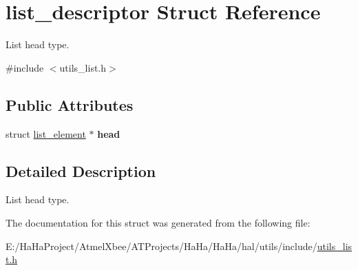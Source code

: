 \hypertarget{structlist__descriptor}{}\section{list\+\_\+descriptor Struct Reference}
\label{structlist__descriptor}


List head type.  




{\ttfamily \#include $<$utils\+\_\+list.\+h$>$}

\subsection*{Public Attributes}
\begin{DoxyCompactItemize}
\item 
\mbox{\label{structlist__descriptor_acc7a3bb5c92dc985a2a7c27c958f1ed8}} 
struct \hyperlink{structlist__element}{list\+\_\+element} $\ast$ {\bfseries head}
\end{DoxyCompactItemize}


\subsection{Detailed Description}
List head type. 

The documentation for this struct was generated from the following file\+:\begin{DoxyCompactItemize}
\item 
E\+:/\+Ha\+Ha\+Project/\+Atmel\+Xbee/\+A\+T\+Projects/\+Ha\+Ha/\+Ha\+Ha/hal/utils/include/\hyperlink{utils__list_8h}{utils\+\_\+list.\+h}\end{DoxyCompactItemize}
